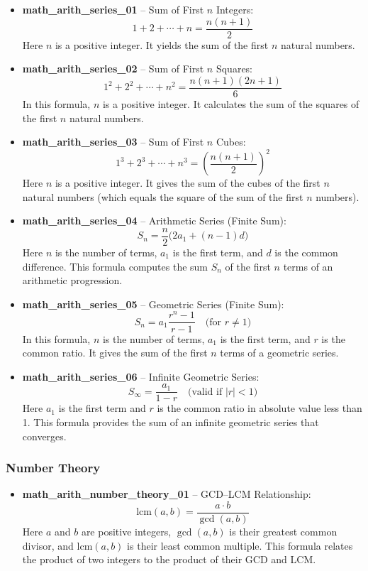 \documentclass[11pt,a4paper]{article}
\begin{document}
\begin{itemize}
\item \textbf{math\_arith\_series\_01} -- Sum of First $n$ Integers: 
\[1 + 2 + \cdots + n = \frac{n(n+1)}{2}\]
Here $n$ is a positive integer. It yields the sum of the first $n$ natural numbers.

\item \textbf{math\_arith\_series\_02} -- Sum of First $n$ Squares: 
\[1^2 + 2^2 + \cdots + n^2 = \frac{n(n+1)(2n+1)}{6}\]
In this formula, $n$ is a positive integer. It calculates the sum of the squares of the first $n$ natural numbers.

\item \textbf{math\_arith\_series\_03} -- Sum of First $n$ Cubes: 
\[1^3 + 2^3 + \cdots + n^3 = \left(\frac{n(n+1)}{2}\right)^2\]
Here $n$ is a positive integer. It gives the sum of the cubes of the first $n$ natural numbers (which equals the square of the sum of the first $n$ numbers).

\item \textbf{math\_arith\_series\_04} -- Arithmetic Series (Finite Sum): 
\[S_n = \frac{n}{2}\big(2a_1 + (n-1)d\big)\]
Here $n$ is the number of terms, $a_1$ is the first term, and $d$ is the common difference. This formula computes the sum $S_n$ of the first $n$ terms of an arithmetic progression.

\item \textbf{math\_arith\_series\_05} -- Geometric Series (Finite Sum): 
\[S_n = a_1\frac{r^n - 1}{r - 1} \quad \text{(for } r \neq 1\text{)}\]
In this formula, $n$ is the number of terms, $a_1$ is the first term, and $r$ is the common ratio. It gives the sum of the first $n$ terms of a geometric series.

\item \textbf{math\_arith\_series\_06} -- Infinite Geometric Series: 
\[S_{\infty} = \frac{a_1}{1 - r} \quad \text{(valid if } |r| < 1\text{)}\]
Here $a_1$ is the first term and $r$ is the common ratio in absolute value less than 1. This formula provides the sum of an infinite geometric series that converges.
\end{itemize}

\subsubsection{Number Theory}

\begin{itemize}
\item \textbf{math\_arith\_number\_theory\_01} -- GCD--LCM Relationship: 
\[\text{lcm}(a,b) = \frac{a \cdot b}{\gcd(a,b)}\]
Here $a$ and $b$ are positive integers, $\gcd(a,b)$ is their greatest common divisor, and $\text{lcm}(a,b)$ is their least common multiple. This formula relates the product of two integers to the product of their GCD and LCM.
\end{itemize}
\end{document}
